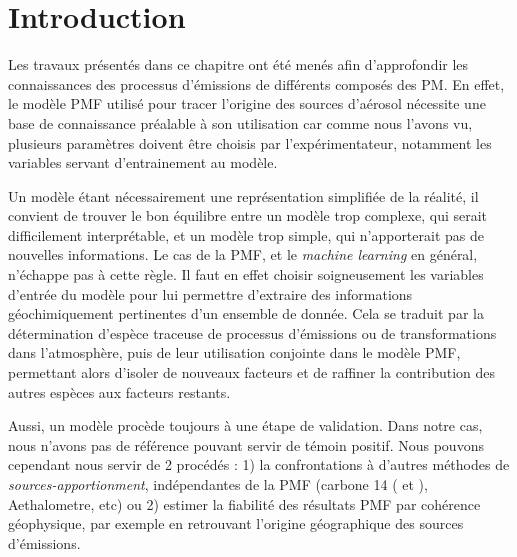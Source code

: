 \section*{Introduction}%
\label{sec:introduction}


Les travaux présentés dans ce chapitre ont été menés afin d'approfondir les connaissances
des processus d'émissions de différents composés des PM. En effet, le modèle PMF utilisé
pour tracer l'origine des sources d'aérosol nécessite une base de connaissance préalable à
son utilisation car comme nous l'avons vu, plusieurs paramètres doivent être choisis par
l'expérimentateur, notamment les variables servant d'entrainement au modèle.

Un modèle étant nécessairement une représentation simplifiée de la réalité, il convient de
trouver le bon équilibre entre un modèle trop complexe, qui serait difficilement
interprétable, et un modèle trop simple, qui n'apporterait pas de nouvelles informations.
Le cas de la PMF, et le \textit{machine learning} en général, n'échappe pas à cette règle.
Il faut en effet choisir soigneusement les variables d'entrée du modèle pour lui permettre
d'extraire des informations géochimiquement pertinentes d'un ensemble de donnée. Cela se
traduit par la détermination d'espèce traceuse de processus d'émissions ou de
transformations dans l'atmosphère, puis de leur utilisation conjointe dans le modèle PMF,
permettant alors d'isoler de nouveaux facteurs et de raffiner la contribution des autres
espèces aux facteurs restants.

Aussi, un modèle procède toujours à une étape de validation. Dans notre cas, nous n'avons
pas de référence pouvant servir de témoin positif. Nous pouvons cependant nous servir de
2 procédés : 1) la confrontations à d'autres méthodes de \textit{sources-apportionment},
indépendantes de la PMF (carbone 14 (\textcite{bonvalotEstimating2016} et
\textcite{chevrierChauffage2016}), Aethalometre, etc) ou 2) estimer la fiabilité des
résultats PMF par cohérence géophysique, par exemple en retrouvant l'origine géographique
des sources d'émissions.

